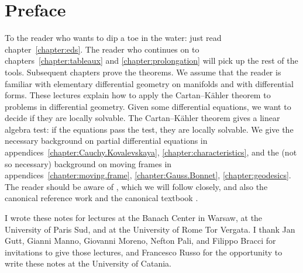 \chapter*{Preface}
To the reader who wants to dip a toe in the water: just read chapter~\ref{chapter:eds}.
The reader who continues on to chapters~\ref{chapter:tableaux} and \ref{chapter:prolongation} will pick up the rest of the tools.
Subsequent chapters prove the theorems.
We assume that the reader is familiar with elementary differential geometry on manifolds and with differential forms.
These lectures explain how to apply the Cartan--K\"ahler theorem to problems in differential geometry.
Given some differential equations, we want to decide if they are locally solvable.
The Cartan--K\"ahler theorem gives a linear algebra test: if the equations pass the test, they are locally solvable.
We give the necessary background on partial differential equations in appendices~\ref{chapter:Cauchy.Kovalevskaya}, \ref{chapter:characteristics}, and the (not so necessary) background on moving frames in appendices~\ref{chapter:moving.frame}, \ref{chapter:Gauss.Bonnet}, \ref{chapter:geodesics}.
The reader should be aware of \cite{Cartan:1945}, which we will follow closely, and also the canonical reference work \cite{BCGGG:1991} and the canonical textbook \cite{Ivey/Landsberg:2003}.

I wrote these notes for lectures at the Banach Center in Warsaw, at the University of Paris Sud, and at the University of Rome Tor Vergata.
I thank Jan Gutt, Gianni Manno, Giovanni Moreno, Nefton Pali, and Filippo Bracci for invitations to give those lectures, and Francesco Russo for the opportunity to write these notes at the University of Catania.
 